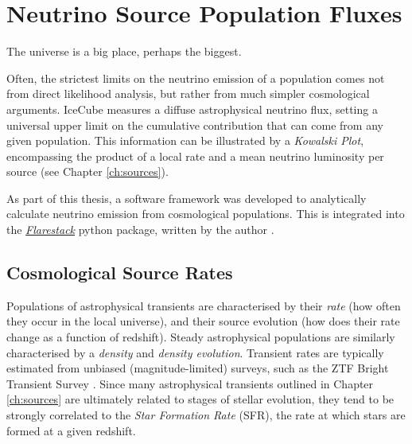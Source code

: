 \setchapterpreamble[u]{\margintoc}
\chapter{Neutrino Source Population Fluxes}
\begin{fquote}The universe is a big place, perhaps the biggest.
\end{fquote}

Often, the strictest limits on the neutrino emission of a population comes not from direct likelihood analysis, but rather from much simpler cosmological arguments. IceCube measures a diffuse astrophysical neutrino flux, setting a universal upper limit on the cumulative contribution that can come from any given population. This information can be illustrated by a \emph{Kowalski Plot}, encompassing the product of a local rate and a mean neutrino luminosity per source (see Chapter \ref{ch:sources}). 

As part of this thesis, a software framework was developed to analytically calculate neutrino emission from cosmological populations. This is integrated into the \emph{\href{https://github.com/IceCubeOpenSource/flarestack}{Flarestack}} python package, written by the author .

\section{Cosmological Source Rates}

Populations of astrophysical transients are characterised by their \emph{rate} (how often they occur in the local universe), and their source evolution (how does their rate change as a function of redshift). Steady astrophysical populations are similarly characterised by a \emph{density} and \emph{density evolution}. Transient rates are typically estimated from unbiased (magnitude-limited) surveys, such as the ZTF Bright Transient Survey . Since many astrophysical transients outlined in Chapter \ref{ch:sources} are ultimately related to stages of stellar evolution, they tend to be strongly correlated to the \emph{Star Formation Rate} (SFR), the rate at which stars are formed at a given redshift. 

